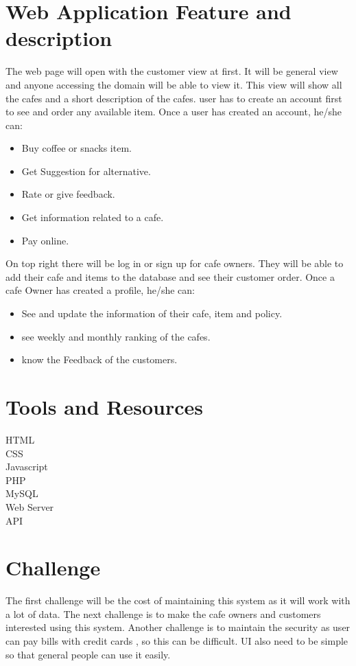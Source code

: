 \documentclass{article}
\begin{document}
{\section{Web Application Feature and description}
The web page will open with the customer view at first. It will be general view
and anyone accessing the domain will be able to view it. This view will show
all the cafes and a short description of the cafes. user has to create an account first to see and
order any available item. Once a user has created an account, he/she can:
\begin{itemize}
    \item Buy coffee or snacks item.
    \item Get Suggestion for alternative.
    \item Rate or give feedback.
    \item Get information related to a cafe.
    \item Pay online.
\end{itemize}
On top right there will be log in or sign up for cafe owners. They will be able to
add their cafe and items to the database and see their customer order. Once a cafe Owner
has created a profile, he/she can:
\begin{itemize}
    \item See and update the information of their cafe, item and policy.
    \item see weekly and monthly ranking of the cafes.
    \item know the Feedback of the customers.
\end{itemize}

\section{Tools and Resources}
HTML\\CSS\\Javascript\\PHP\\MySQL\\Web Server\\API

\section{Challenge}
 The first challenge will be the cost of maintaining this system as it will work with a lot of data. The next challenge is to make the cafe owners and customers interested using this system. Another challenge is to maintain the security as user can pay bills with credit cards , so this can be difficult. UI also need to be simple so that general people can use it easily.

}

  
\end{document}
